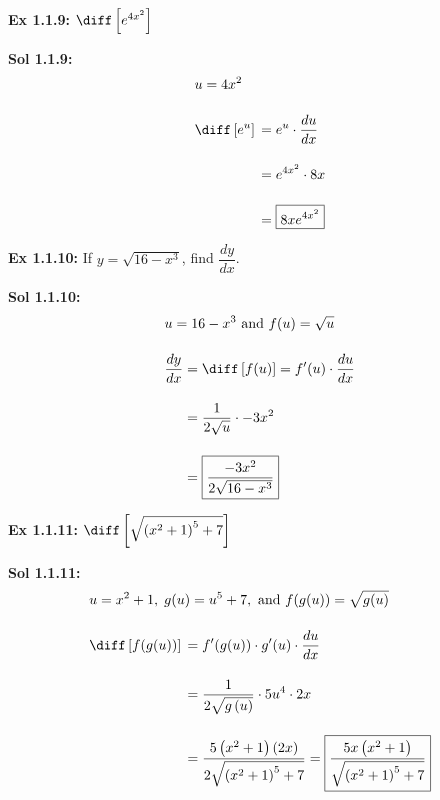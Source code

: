 \begin{tcolorbox}[example]
    \textbf{Ex 1.1.9: } $\diff \left[e^{4x^2}\right]$ 
\end{tcolorbox}
\begin{tcolorbox}[solution]
    \textbf{Sol 1.1.9: } \begin{align*}
        & u = 4x^2 \\[11pt]
        & \diff \left[e^u\right] \begin{aligned}[t]
            & = e^u \cdot \dfrac{du}{dx} \\[11pt]
            & = e^{4x^2} \cdot 8x \\[11pt]
            & = \boxed{8xe^{4x^2}}
        \end{aligned}
    \end{align*}
\end{tcolorbox} \vspace{11pt}

\begin{tcolorbox}[example]
    \textbf{Ex 1.1.10: } If $y = \sqrt{16 - x^3}$, find $\dfrac{dy}{dx}$. 
\end{tcolorbox}
\begin{tcolorbox}[solution]
    \textbf{Sol 1.1.10: } \begin{align*}
        & u = 16 - x^3 \text{ and } f(u) = \sqrt{u} \\[11pt]
        & \dfrac{dy}{dx} \begin{aligned}[t]
            & = \diff \left[f(u)\right] = f'(u) \cdot \dfrac{du}{dx} \\[11pt] 
            & = \dfrac{1}{2\sqrt{u}} \cdot -3x^2 \\[11pt]
            & = \boxed{\dfrac{-3x^2}{2\sqrt{16 - x^3}}}
        \end{aligned}
    \end{align*} 
\end{tcolorbox} \vspace{11pt}

\begin{tcolorbox}[example]
    \textbf{Ex 1.1.11: } $\diff \left[\sqrt{\left(x^2 + 1\right)^5 + 7}\right]$
\end{tcolorbox}
\begin{tcolorbox}[solution]
    \textbf{Sol 1.1.11: }\begin{align*}
        & u = x^2 + 1, \; g(u) = u^5 + 7, \text{ and } f(g(u)) = \sqrt{g(u)} \\[11pt]
        & \diff \left[f(g(u))\right] \begin{aligned}[t]
            & = f'(g(u)) \cdot g'(u) \cdot \dfrac{du}{dx} \\[11pt]
            & = \dfrac{1}{2\sqrt{g\left(u\right)}} \cdot 5u^4 \cdot 2x \\[11pt]
            & = \dfrac{5\left(x^2 + 1\right)(2x)}{2\sqrt{\left(x^2 + 1\right)^5 + 7}} = \boxed{\dfrac{5x\left(x^2 + 1\right)}{\sqrt{\left(x^2 + 1\right)^5 + 7}}}
        \end{aligned}
    \end{align*}
\end{tcolorbox}

